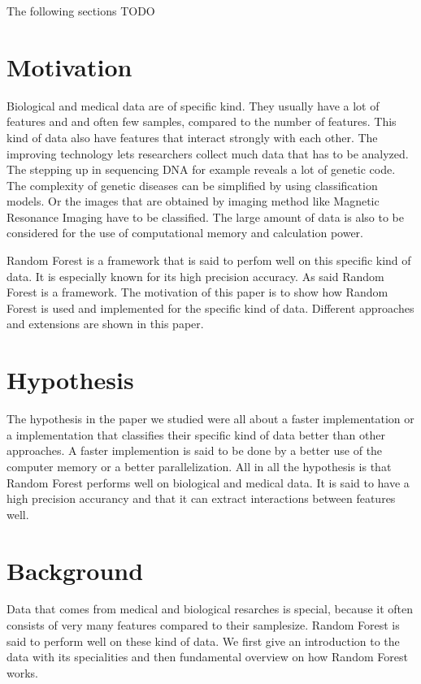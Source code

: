 \documentclass{sig-alternate-05-2015}
\begin{document}
The following sections TODO


\section{Motivation}
Biological and medical data are of specific kind. They usually have a lot of features and and often few samples, compared to the number of features. This kind of data also have features that interact strongly with each other. The improving technology lets researchers collect much data that has to be analyzed. The stepping up in sequencing DNA for example reveals a lot of genetic code. The complexity of genetic diseases can be simplified by using classification models. Or the images that are obtained by imaging method like Magnetic Resonance Imaging have to be classified. The large amount of data is also to be considered for the use of computational memory and calculation power.

Random Forest is a framework that is said to perfom well on this specific kind of data. It is especially known for its high precision accuracy. As said Random Forest is a framework. The motivation of this paper is to show how Random Forest is used and implemented for the specific kind of data. Different approaches and extensions are shown in this paper.

\section{Hypothesis}
The hypothesis in the paper we studied were all about a faster implementation or a implementation that classifies their specific kind of data better than other approaches. A faster implemention is said to be done by a better use of the computer memory or a better parallelization. All in all the hypothesis is that Random Forest performs well on biological and medical data. It is said to have a high precision accurancy and that it can extract interactions between features well.

\section{Background}
Data that comes from medical and biological resarches is special, because it often consists of very many features compared to their samplesize. Random Forest is said to perform well on these kind of data. We first give an introduction to the data with its specialities and then fundamental overview on how Random Forest works.
\end{document}

